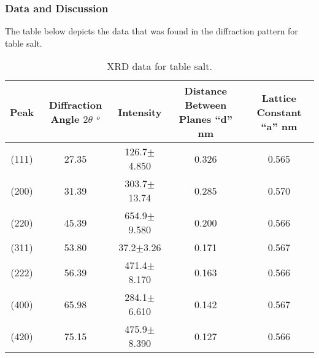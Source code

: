 \documentclass{beamer}
\begin{document}

\begin{frame}
\frametitle{Data and Discussion}
The table below depicts the data that was found in the diffraction pattern for table salt.
\begin{table}[htp]
\begin{center}
\begin{tabular}{|c|c|c|c|c|}
\hline \textbf{\tiny{Peak}} & \textbf{\tiny{Diffraction Angle $2\theta$ $^{o}$}} & \textbf{\tiny{Intensity}} & \textbf{\tiny{Distance Between Planes ``d'' nm}} & \textbf{\tiny{Lattice Constant ``a'' nm}} \\ \hline
\tiny{(111)} & \tiny{27.35} & \tiny{126.7$\pm$4.850} & \tiny{0.326} & \tiny{0.565} \\ \hline
\tiny{(200)} & \tiny{31.39} & \tiny{303.7$\pm$13.74} & \tiny{0.285} & \tiny{0.570} \\ \hline
\tiny{(220)} & \tiny{45.39} & \tiny{654.9$\pm$9.580} & \tiny{0.200} & \tiny{0.566} \\ \hline
\tiny{(311)} & \tiny{53.80} & \tiny{37.2$\pm$3.26} & \tiny{0.171} & \tiny{0.567} \\ \hline
\tiny{(222)} & \tiny{56.39} & \tiny{471.4$\pm$8.170} & \tiny{0.163} & \tiny{0.566} \\ \hline
\tiny{(400)} & \tiny{65.98} & \tiny{284.1$\pm$6.610} & \tiny{0.142} & \tiny{0.567} \\ \hline
\tiny{(420)} & \tiny{75.15} & \tiny{475.9$\pm$8.390} & \tiny{0.127} & \tiny{0.566} \\ \hline
\end{tabular}
\caption{XRD data for table salt.}
\end{center}
\label{default}
\end{table}%
\end{frame}

\end{document}
